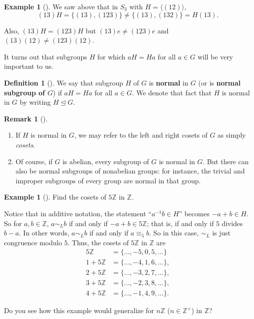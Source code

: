 \documentclass[10pt,openany,oneside]{book}
\newcommand{\terminology}[1]{\textbf{#1}}
\theoremstyle{plain}
\theoremstyle{definition}
\newtheorem{definition}[theorem]{Definition}
\theoremstyle{definition}
\newtheorem{remark}[theorem]{Remark}
\theoremstyle{definition}
\newtheorem{example}[theorem]{Example}
\theoremstyle{definition}
\numberwithin{equation}{section}
\def\Z{\mathbb{Z}}
\def\siml{\sim_L}
\newcommand{\amp}{&}
\begin{document}
\begin{example}[]\label{example-69}
We saw above that in \(S_3\) with \(H=\langle (12)\rangle\),%
\begin{equation*}
(13)H=\{(13),(123)\} \neq \{(13),(132)\}=H(13).
\end{equation*}
%
\par
Also, \((13)H=(123)H\) but \((13)e\neq (123)e\) and \((13)(12)\neq (123)(12)\).%
\end{example}
It turns out that subgroups \(H\) for which \(aH=Ha\) for all \(a\in
G\) will be very important to us.%
\begin{definition}[{}]\label{definition-61}
\label{notation-71}
We say that subgroup \(H\) of \(G\) is \terminology{normal} in \(G\) (or is  \terminology{normal subgroup of \(G\)}) if \(aH=Ha\) for all \(a\in G\). We denote that fact that \(H\) is normal in \(G\) by writing \(H\unlhd G\).%
\end{definition}
\begin{remark}[]\label{remark-40}
\leavevmode%
\begin{enumerate}
\item\hypertarget{li-414}{}If \(H\) is normal in \(G\), we may refer to the left and right cosets of \(G\) as simply \emph{cosets}.%
\item\hypertarget{li-415}{}Of course, if \(G\) is abelian, every subgroup of \(G\) is normal in \(G\). But there can also be normal subgroups of nonabelian groups: for instance, the trivial and improper subgroups of every group are normal in that group.%
\end{enumerate}
%
\end{remark}
\begin{example}[]\label{example-70}
Find the cosets of \(5\Z\) in \(\Z\).%
\par
Notice that in additive notation, the statement ``\(a^{-1}b\in H\)'' becomes \(-a+b\in H\). So for \(a,b\in \Z\), \(a\siml b\) if and only if \(-a+b \in
5\Z\); that is, if and only if \(5\) divides \(b-a\). In other words, \(a\siml b\) if and only if \(a\equiv_5 b\). So in this case, \(\siml\) is just congruence modulo \(5\). Thus, the cosets of \(5\Z\) in \(\Z\) are%
\begin{align*}
5\Z\amp =\{\ldots,-5,0,5,\ldots\}\\
1+5\Z\amp =\{\ldots,-4, 1,
6,\ldots\},\\
2+5\Z\amp =\{\ldots,-3,2, 7,
\ldots\},\\
3+5\Z\amp =\{\ldots,-2,3, 8,
\ldots\},\\
4+5\Z\amp =\{\ldots,-1, 4, 9,
\ldots\}.
\end{align*}
%
\par
Do you see how this example would generalize for \(n\Z\) (\(n \in \Z^+\)) in \(\Z\)?%
\end{example}
\end{document}
